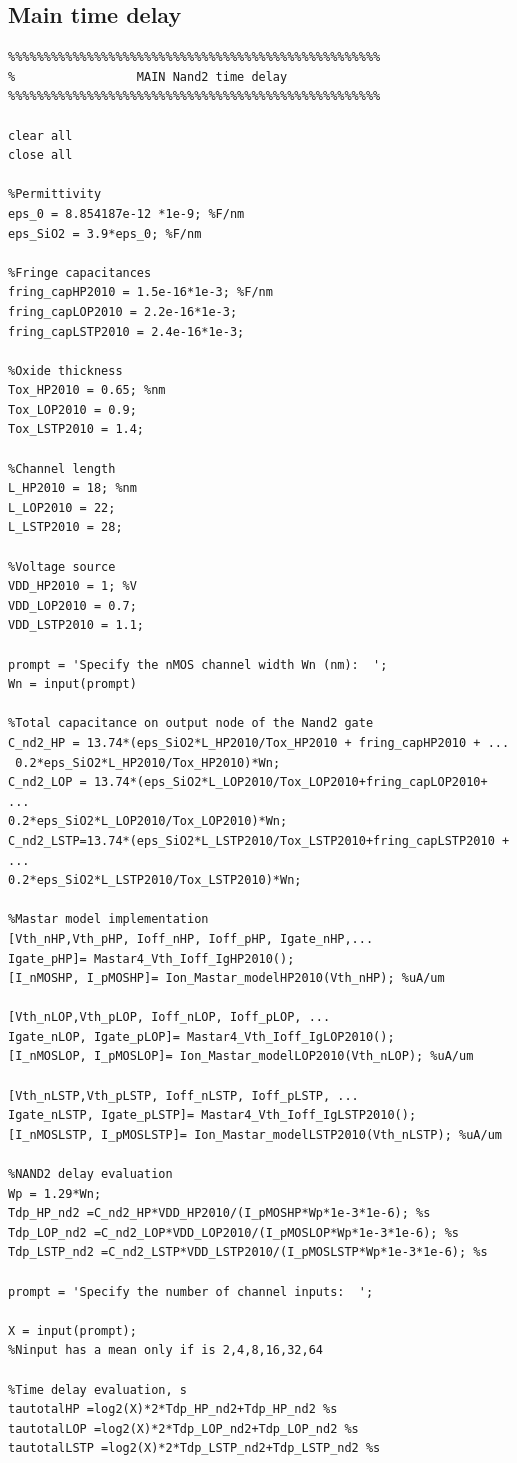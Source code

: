 \subsection{Main time delay}
\begin{lstlisting}
%%%%%%%%%%%%%%%%%%%%%%%%%%%%%%%%%%%%%%%%%%%%%%%%%%%%
%                 MAIN Nand2 time delay                      
%%%%%%%%%%%%%%%%%%%%%%%%%%%%%%%%%%%%%%%%%%%%%%%%%%%%

clear all
close all

%Permittivity
eps_0 = 8.854187e-12 *1e-9; %F/nm
eps_SiO2 = 3.9*eps_0; %F/nm

%Fringe capacitances
fring_capHP2010 = 1.5e-16*1e-3; %F/nm
fring_capLOP2010 = 2.2e-16*1e-3;
fring_capLSTP2010 = 2.4e-16*1e-3;

%Oxide thickness
Tox_HP2010 = 0.65; %nm
Tox_LOP2010 = 0.9;
Tox_LSTP2010 = 1.4;

%Channel length
L_HP2010 = 18; %nm
L_LOP2010 = 22;
L_LSTP2010 = 28;

%Voltage source
VDD_HP2010 = 1; %V
VDD_LOP2010 = 0.7;
VDD_LSTP2010 = 1.1;

prompt = 'Specify the nMOS channel width Wn (nm):  ';
Wn = input(prompt)

%Total capacitance on output node of the Nand2 gate
C_nd2_HP = 13.74*(eps_SiO2*L_HP2010/Tox_HP2010 + fring_capHP2010 + ...
 0.2*eps_SiO2*L_HP2010/Tox_HP2010)*Wn;
C_nd2_LOP = 13.74*(eps_SiO2*L_LOP2010/Tox_LOP2010+fring_capLOP2010+ ...
0.2*eps_SiO2*L_LOP2010/Tox_LOP2010)*Wn;
C_nd2_LSTP=13.74*(eps_SiO2*L_LSTP2010/Tox_LSTP2010+fring_capLSTP2010 + ...
0.2*eps_SiO2*L_LSTP2010/Tox_LSTP2010)*Wn;

%Mastar model implementation
[Vth_nHP,Vth_pHP, Ioff_nHP, Ioff_pHP, Igate_nHP,...
Igate_pHP]= Mastar4_Vth_Ioff_IgHP2010();
[I_nMOSHP, I_pMOSHP]= Ion_Mastar_modelHP2010(Vth_nHP); %uA/um

[Vth_nLOP,Vth_pLOP, Ioff_nLOP, Ioff_pLOP, ...
Igate_nLOP, Igate_pLOP]= Mastar4_Vth_Ioff_IgLOP2010();
[I_nMOSLOP, I_pMOSLOP]= Ion_Mastar_modelLOP2010(Vth_nLOP); %uA/um

[Vth_nLSTP,Vth_pLSTP, Ioff_nLSTP, Ioff_pLSTP, ...
Igate_nLSTP, Igate_pLSTP]= Mastar4_Vth_Ioff_IgLSTP2010();
[I_nMOSLSTP, I_pMOSLSTP]= Ion_Mastar_modelLSTP2010(Vth_nLSTP); %uA/um

%NAND2 delay evaluation
Wp = 1.29*Wn;
Tdp_HP_nd2 =C_nd2_HP*VDD_HP2010/(I_pMOSHP*Wp*1e-3*1e-6); %s
Tdp_LOP_nd2 =C_nd2_LOP*VDD_LOP2010/(I_pMOSLOP*Wp*1e-3*1e-6); %s
Tdp_LSTP_nd2 =C_nd2_LSTP*VDD_LSTP2010/(I_pMOSLSTP*Wp*1e-3*1e-6); %s

prompt = 'Specify the number of channel inputs:  ';

X = input(prompt);
%Ninput has a mean only if is 2,4,8,16,32,64

%Time delay evaluation, s
tautotalHP =log2(X)*2*Tdp_HP_nd2+Tdp_HP_nd2 %s
tautotalLOP =log2(X)*2*Tdp_LOP_nd2+Tdp_LOP_nd2 %s
tautotalLSTP =log2(X)*2*Tdp_LSTP_nd2+Tdp_LSTP_nd2 %s
\end{lstlisting}

